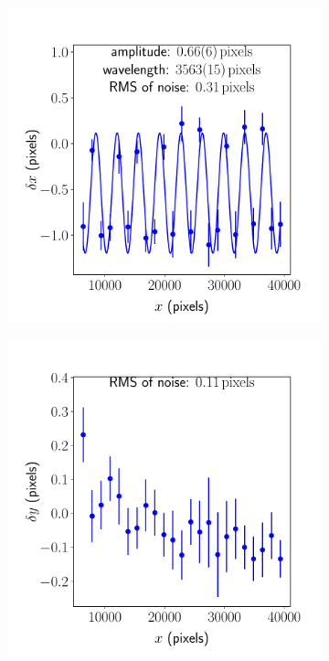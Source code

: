 \documentclass{article}
\begin{document}
\begin{figure}[ht]
\begin{subfigure}{0.24\linewidth}
		\caption{}
		\label{fig:sinewave2yyAKY}
	\end{subfigure}
	\begin{subfigure}{0.24\linewidth}
		\includegraphics[width=\linewidth]{sine-wave-4-xx-AKY.pdf}
		\caption{}
		\label{fig:sinewave4xxAKY}
	\end{subfigure}
	\begin{subfigure}{0.24\linewidth}
		\includegraphics[width=\linewidth]{sine-wave-4-yx-AKY.pdf}

\end{subfigure}
\end{figure}
\end{document}
